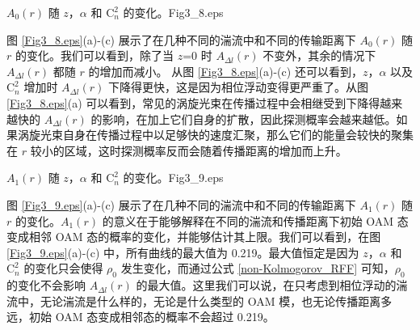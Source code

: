 \documentclass[master]{thesis-uestc}
\begin{document}
\begin{pics}[H]{$A_{0}(r)$ 随 $z$，$\alpha$ 和 $\mathrm{C}^2_n$ 的变化。}{Fig3_8.eps}
\end{pics}

图 \ref{Fig3_8.eps}(a)-(c) 展示了在几种不同的湍流中和不同的传输距离下 $A_{0}(r)$ 随 $r$ 的变化。我们可以看到，除了当 $z$=0 时 $A_{\Delta l}(r)$ 不变外，其余的情况下 $A_{\Delta l}(r)$ 都随 $r$ 的增加而减小。 从图 \ref{Fig3_8.eps}(a)-(c) 还可以看到，$z$，$\alpha$ 以及 $\mathrm{C}^2_n$ 增加时 $A_{\Delta l}(r)$ 下降得更快，这是因为相位浮动变得更严重了。从图 \ref{Fig3_8.eps}(a) 可以看到，常见的涡旋光束在传播过程中会相继受到下降得越来越快的 $A_{\Delta l}(r)$ 的影响，在加上它们自身的扩散，因此探测概率会越来越低。如果涡旋光束自身在传播过程中以足够快的速度汇聚，那么它们的能量会较快的聚集在 $r$ 较小的区域，这时探测概率反而会随着传播距离的增加而上升。

\begin{pics}[H]{$A_{1}(r)$ 随 $z$，$\alpha$ 和 $\mathrm{C}^2_n$ 的变化。}{Fig3_9.eps}
\end{pics}

图 \ref{Fig3_9.eps}(a)-(c) 展示了在几种不同的湍流中和不同的传输距离下 $A_{1}(r)$ 随 $r$ 的变化。$A_{1}(r)$ 的意义在于能够解释在不同的湍流和传播距离下初始 OAM 态变成相邻 OAM 态的概率的变化，并能够估计其上限。我们可以看到，在图 \ref {Fig3_9.eps}(a)-(c) 中，所有曲线的最大值为 0.219。最大值恒定是因为 $z$，$\alpha$ 和 $\mathrm{C}^2_n$ 的变化只会使得 $\rho_0$ 发生变化，而通过公式 \eqref{non-Kolmogorov_RFF} 可知，$\rho_0$ 的变化不会影响 $A_{\Delta l}(r)$ 的最大值。这里我们可以说，在只考虑到相位浮动的湍流中，无论湍流是什么样的，无论是什么类型的 OAM 模，也无论传播距离多远，初始 OAM 态变成相邻态的概率不会超过 0.219。
\end{document}
